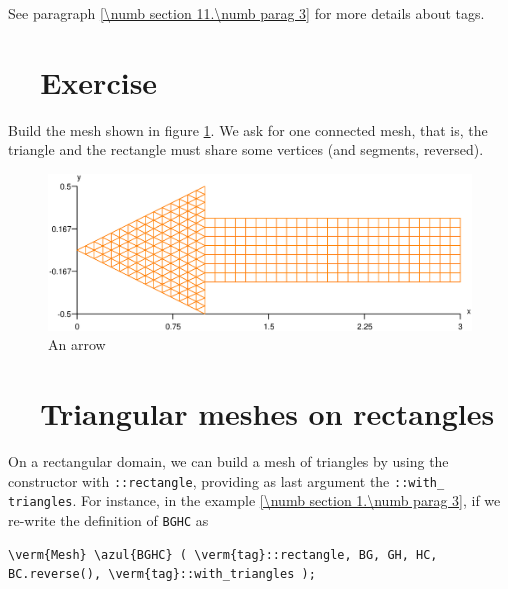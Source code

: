 See paragraph \ref{\numb section 11.\numb parag 3} for more details about tags.


\section{~~Exercise}\label{\numb section 2.\numb parag 2}

Build the mesh shown in figure \ref{\numb section 2.\numb fig 2}.
We ask for one connected mesh, that is, the triangle and the rectangle must share some vertices
(and segments, reversed).

\begin{figure}[ht] \centering
  \includegraphics[width=135mm]{arrow}
  \caption{An arrow}
  \label{\numb section 2.\numb fig 2}
\end{figure}


\section{~~Triangular meshes on rectangles}\label{\numb section 2.\numb parag 3}

On a rectangular domain, we can build a mesh of triangles by using the {\small\tt {}}
constructor with {\small\tt {}::rectangle}, providing as last argument the
{\small\tt {}::with\_\,triangles}.
For instance, in the example \ref{\numb section 1.\numb parag 3},
if we re-write the definition of {\small\tt BGHC} as

\begin{Verbatim}[commandchars=\\\{\},formatcom=\small\tt,baselinestretch=0.94]
   \verm{Mesh} \azul{BGHC} ( \verm{tag}::rectangle, BG, GH, HC, BC.reverse(), \verm{tag}::with_triangles );
\end{Verbatim}

